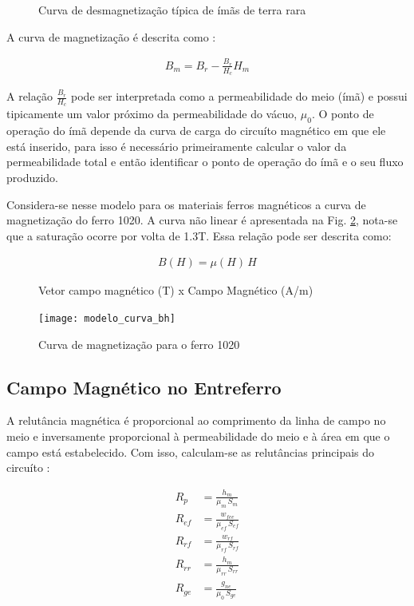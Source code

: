 \begin{figure}[!ht]
	\centering
	\def\svgwidth{0.7\columnwidth}
	
	\caption{Curva de desmagnetização típica de ímãs de terra rara}
	\label{Fig:Modelagem:circuito:passivo:ima}
\end{figure}

A curva de magnetização é descrita como :

\begin{align}
B_m = B_r - \frac{B_r}{H_c} H_m
\label{eq:p:ima}
\end{align}

A relação $\frac{B_r}{H_c}$ pode ser interpretada como a permeabilidade do meio (ímã) e possui tipicamente um valor próximo da permeabilidade do vácuo, $\mu_0$. O ponto de operação do ímã depende da curva de carga do circuíto magnético em que ele está inserido, para isso é necessário primeiramente calcular o valor da permeabilidade total e então identificar o ponto de operação do ímã e o seu fluxo produzido.

Considera-se nesse modelo para os materiais ferros magnéticos a curva de magnetização do ferro 1020. A curva não linear é apresentada na Fig. \ref{Fig:Modelagem:BH}, nota-se que a saturação ocorre por volta de 1.3T. Essa relação pode ser descrita como:

\begin{align}
B(H) = \mu(H) \, H
\label{eq:p:BH:ferro}
\end{align}

\begin{figure}[!ht]
	\centering
	\caption*{ Vetor campo magnético (T) x Campo Magnético (A/m)}
	\texttt{[image: modelo\_curva\_bh]}
	\caption{Curva de magnetização para o ferro 1020}
	\label{Fig:Modelagem:BH}
\end{figure}


\subsection{Campo Magnético no Entreferro}

A relutância magnética é proporcional ao comprimento da linha de campo no meio e inversamente proporcional à permeabilidade do meio e à área em que o campo está estabelecido. Com isso, calculam-se as relutâncias principais do circuíto :

\begin{align}
R_{p}  &= \frac{h_m}{\mu_m \, S_m}			\\
R_{ef} &= \frac{w_{fee}}{\mu_{ef}\, S_{ef}}  \\     
R_{rf} &= \frac{w_{rf}}{\mu_{rf}\, S_{rf}}   \\    
R_{rr} &= \frac{h_m}{\mu_{rr} \, S_{rr}}     \\      
R_{ge} &= \frac{g_{ne}}{\mu_0  \, S_{ge}}        
\end{align}


